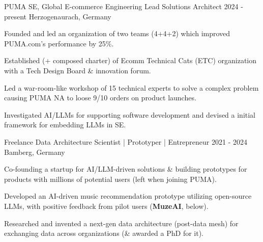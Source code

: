 {}


\begin{cventries}






    
        
  \cventry
    {PUMA SE, Global E-commerce Engineering}  %
    {Lead Solutions Architect} %
    {2024 - present} %
    {Herzogenaurach, Germany} %
    {
      \begin{cvitems} %
		\item {Founded and led an organization of two teams (4+4+2) which improved PUMA.com's performance by 25\%.}
		\item {Established (+ composed charter) of Ecomm Technical Cats (ETC) organization with a Tech Design Board \& innovation forum.}
		\item {Led a war-room-like workshop of 15 technical experts to solve a complex problem causing PUMA NA to loose 9/10 orders on product launches.}
		\item {Investigated AI/LLMs for supporting software development and devised a initial framework for embedding LLMs in SE.}						
    \end{cvitems}
    }
    



    
        
  \cventry
    {Freelance}   %
    {Data Architecture Scientist | Prototyper | Entrepreneur} %
    {2021 - 2024} %
    {Bamberg, Germany} %
    {
      \begin{cvitems} %
		\item {Co-founding a startup for AI/LLM-driven solutions \& building prototypes for products with millions of potential users (left when joining PUMA).}
		\item {Developed an AI-driven music recommendation prototype utilizing open-source LLMs, with positive feedback from pilot users (\textbf{MuzeAI}, below).}
		\item {Researched and invented a next-gen data architecture (post-data mesh) for exchanging data across organizations (\& awarded a PhD for it).}
    \end{cvitems}
    }
    



\end{cventries}
